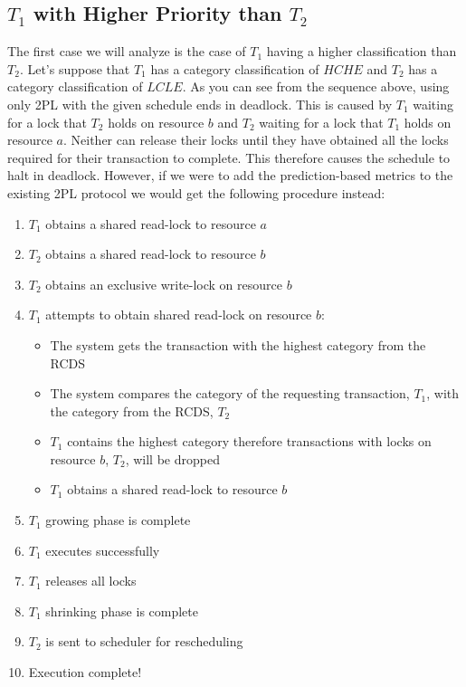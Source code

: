 \documentclass[conference]{IEEEtran}
\begin{document}
\subsection{$T_{1}$ with Higher Priority than $T_{2}$}
\label{sec:t1_higher_than_t2}
The first case we will analyze is the case of $T_{1}$ having a higher classification than $T_{2}$. Let's suppose that $T_{1}$ has a category classification of $HCHE$ and $T_{2}$ has a category classification of $LCLE$. As you can see from the sequence above, using only 2PL with the given schedule ends in deadlock. This is caused by $T_{1}$ waiting for a lock that $T_{2}$ holds on resource $b$ and $T_{2}$ waiting for a lock that $T_{1}$ holds on resource $a$. Neither can release their locks until they have obtained all the locks required for their transaction to complete. This therefore causes the schedule to halt in deadlock. However, if we were to add the prediction-based metrics to the existing 2PL protocol we would get the following procedure instead:

\begin{enumerate}
  \item $T_{1}$ obtains a shared read-lock to resource $a$
  \item $T_{2}$ obtains a shared read-lock to resource $b$
  \item $T_{2}$ obtains an exclusive write-lock on resource $b$
  \item $T_{1}$ attempts to obtain shared read-lock on resource $b$:
    \begin{itemize}
        \item The system gets the transaction with the highest category from the RCDS
        \item The system compares the category of the requesting transaction, $T_{1}$, with the category from the RCDS, $T_{2}$
        \item $T_{1}$ contains the highest category therefore transactions with locks on resource $b$, $T_{2}$, will be dropped
        \item $T_{1}$ obtains a shared read-lock to resource $b$
    \end{itemize}
  \item $T_{1}$ growing phase is complete
  \item $T_{1}$ executes successfully
  \item $T_{1}$ releases all locks
  \item $T_{1}$ shrinking phase is complete
  \item $T_{2}$ is sent to scheduler for rescheduling
  \item Execution complete!
\end{enumerate}
\end{document}
